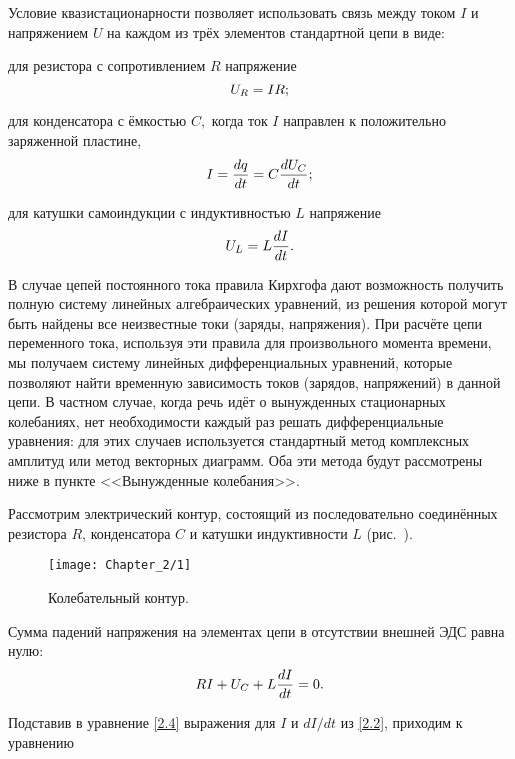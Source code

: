 Условие квазистационарности позволяет использовать связь между током $I$ и напряжением $U$ на каждом из трёх элементов стандартной цепи в виде: 

для резистора с сопротивлением $R$ напряжение
\begin{equation}
	\eqmark{2.1}
	U_R=IR;
\end{equation}

для конденсатора с ёмкостью $C,$ когда ток $I$ направлен к положительно заряженной пластине,
\begin{equation}
	\eqmark{2.2}
	I=\dfrac{dq}{dt}=C\dfrac{dU_C}{dt};
\end{equation}

для катушки самоиндукции с индуктивностью $L$ напряжение
\begin{equation}
	\eqmark{2.3}
	U_L=L\dfrac{dI}{dt}.
\end{equation}

В случае цепей постоянного тока правила Кирхгофа дают возможность получить полную систему линейных алгебраических уравнений, из решения которой могут быть найдены все неизвестные токи (заряды, напряжения). При расчёте цепи переменного тока, используя эти правила для произвольного момента времени, мы получаем систему линейных дифференциальных уравнений, которые позволяют найти временную зависимость токов (зарядов, напряжений) в данной цепи. В частном случае, когда речь идёт о вынужденных стационарных колебаниях, нет необходимости каждый раз решать дифференциальные уравнения: для этих случаев используется стандартный метод комплексных амплитуд или метод векторных диаграмм. Оба эти метода будут рассмотрены ниже в пункте <<Вынужденные колебания>>.


Рассмотрим электрический контур, состоящий из последовательно соединённых резистора $R$, конденсатора $C$ и катушки индуктивности $L$ (рис.~). 

\begin{figure}[h!]
	\centering\texttt{[image: Chapter\_2/1]}
	\caption{Колебательный контур.}
\end{figure}


Сумма падений напряжения на элементах цепи в отсутствии внешней ЭДС равна нулю:
\begin{equation}
	\eqmark{2.4}
	RI+U_C+L\dfrac{dI}{dt}=0.
\end{equation}

Подставив в уравнение \eqref{2.4} выражения для $I$ и $dI/dt$ из \eqref{2.2}, приходим к уравнению


